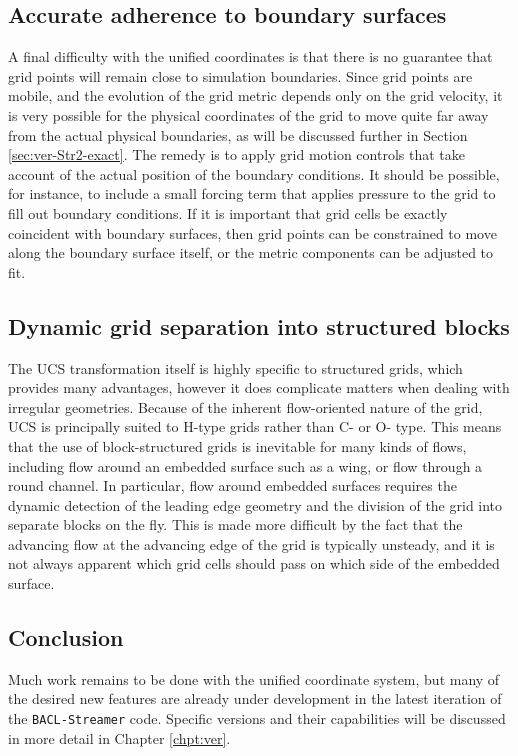 \subsection{Accurate adherence to boundary surfaces}A final difficulty with the unified coordinates is that there is no guarantee that grid points will remain close to simulation boundaries. Since grid points are mobile, and the evolution of the grid metric depends only on the grid velocity, it is very possible for the physical coordinates of the grid to move quite far away from the actual physical boundaries, as will be discussed further in Section \ref{sec:ver-Str2-exact}. The remedy is to apply grid motion controls that take account of the actual position of the boundary conditions. It should be possible, for instance, to include a small forcing term that applies pressure to the grid to fill out boundary conditions. 
If it is important that grid cells be exactly coincident with boundary surfaces, then grid points can be constrained to move along the boundary surface itself, or the metric components can be adjusted to fit.

\subsection{Dynamic grid separation into structured blocks}
The UCS transformation itself is highly specific to structured grids, which provides many advantages, however it does complicate matters when dealing with irregular geometries. Because of the inherent flow-oriented nature of the grid, UCS is principally suited to H-type grids rather than C- or O- type. This means that the use of block-structured grids is inevitable for many kinds of flows, including flow around an embedded surface such as a wing, or flow through a round channel. In particular, flow around embedded surfaces requires the dynamic detection of the leading edge geometry and the division of the grid into separate blocks on the fly. This is made more difficult by the fact that the advancing flow at the advancing edge of the grid is typically unsteady, and it is not always apparent which grid cells should pass on which side of the embedded surface. 

\subsection{Conclusion}
Much work remains to be done with the unified coordinate system, but many of the desired new features are already under development in the latest iteration of the {\tt BACL-Streamer} code. Specific versions and their capabilities will be discussed in more detail in Chapter \ref{chpt:ver}. 